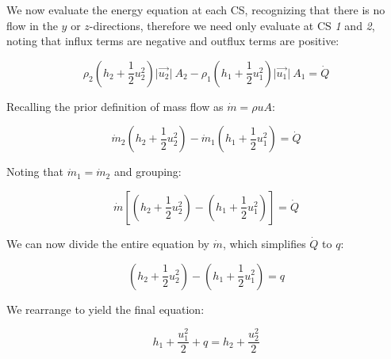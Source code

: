 \documentclass[../main.tex]{subfiles}
\begin{document}
\begin{enumerate}[label = (\alph*)]
        We now evaluate the energy equation at each CS, recognizing that there is no flow in the \(y\) or \(z\)-directions, therefore we need only evaluate at CS \textit{1} and \textit{2}, noting that influx terms are negative and outflux terms are positive:

        \[
            \rho_2 \left({h_2 + \frac{1}{2}u_2^2 }\right) \lvert\vec{u_2}\rvert\ A_2 -%
            \rho_1 \left({h_1 + \frac{1}{2}u_1^2 }\right) \lvert\vec{u_1}\rvert\ A_1 = 
            \dot{Q}  
        \]

        Recalling the prior definition of mass flow as \(\dot{m} = \rho u A\):

        \[
            \dot{m}_2 \left({h_2 + \frac{1}{2}u_2^2 }\right)  -%
            \dot{m}_1 \left({h_1 + \frac{1}{2}u_1^2 }\right)  = 
            \dot{Q}  
        \]

        Noting that \(\dot{m}_1 = \dot{m}_2\) and grouping:

        \[
            \dot{m} \left[ 
            \left({h_2 + \frac{1}{2}u_2^2 }\right)  -%
            \left({h_1 + \frac{1}{2}u_1^2 }\right)
            \right]  = 
            \dot{Q}  
        \]

        We can now divide the entire equation by \(\dot{m}\), which simplifies \(\dot{Q}\) to \(q\):

        \[     
            \left({h_2 + \frac{1}{2}u_2^2 }\right)  -%
            \left({h_1 + \frac{1}{2}u_1^2 }\right)  = 
            q  
        \]

        We rearrange to yield the final equation:

        \[
            \boxed{
            h_1 + \frac{u_1^2}{2} + q = h_2 + \frac{u_2^2}{2}    
            }  
        \]

\end{enumerate}
\end{document}
